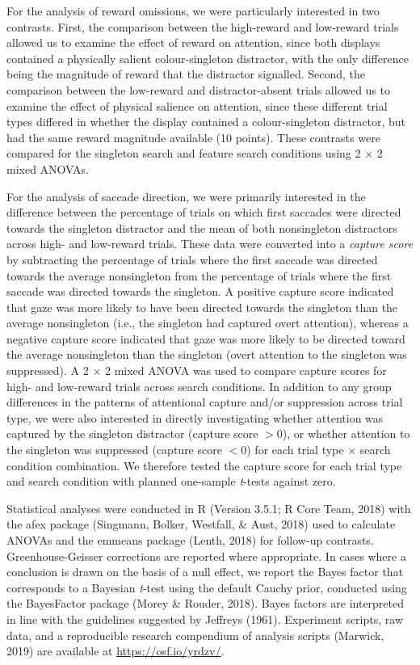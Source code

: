 \documentclass[man, a4paper, noextraspace, 11pt,floatsintext]{apa6}
\theoremstyle{definition}
\theoremstyle{definition}
\theoremstyle{definition}
\theoremstyle{remark}
\begin{document}
For the analysis of reward omissions, we were particularly interested in
two contrasts. First, the comparison between the high-reward and
low-reward trials allowed us to examine the effect of reward on
attention, since both displays contained a physically salient
colour-singleton distractor, with the only difference being the
magnitude of reward that the distractor signalled. Second, the
comparison between the low-reward and distractor-absent trials allowed
us to examine the effect of physical salience on attention, since these
different trial types differed in whether the display contained a
colour-singleton distractor, but had the same reward magnitude available
(10 points). These contrasts were compared for the singleton search and
feature search conditions using 2 \(\times\) 2 mixed ANOVAs.

For the analysis of saccade direction, we were primarily interested in
the difference between the percentage of trials on which first saccades
were directed towards the singleton distractor and the mean of both
nonsingleton distractors across high- and low-reward trials. These data
were converted into a \emph{capture score} by subtracting the percentage
of trials where the first saccade was directed towards the average
nonsingleton from the percentage of trials where the first saccade was
directed towards the singleton. A positive capture score indicated that
gaze was more likely to have been directed towards the singleton than
the average nonsingleton (i.e., the singleton had captured overt
attention), whereas a negative capture score indicated that gaze was
more likely to be directed toward the average nonsingleton than the
singleton (overt attention to the singleton was suppressed). A 2
\(\times\) 2 mixed ANOVA was used to compare capture scores for high-
and low-reward trials across search conditions. In addition to any group
differences in the patterns of attentional capture and/or suppression
across trial type, we were also interested in directly investigating
whether attention was captured by the singleton distractor (capture
score \(>0\)), or whether attention to the singleton was suppressed
(capture score \(<0\)) for each trial type \(\times\) search condition
combination. We therefore tested the capture score for each trial type
and search condition with planned one-sample \emph{t}-tests against
zero.

Statistical analyses were conducted in R (Version 3.5.1; R Core Team,
2018) with the afex package (Singmann, Bolker, Westfall, \& Aust, 2018)
used to calculate ANOVAs and the emmeans package (Lenth, 2018) for
follow-up contrasts. Greenhouse-Geisser corrections are reported where
appropriate. In cases where a conclusion is drawn on the basis of a null
effect, we report the Bayes factor that corresponds to a Bayesian
\emph{t}-test using the default Cauchy prior, conducted using the
BayesFactor package (Morey \& Rouder, 2018). Bayes factors are
interpreted in line with the guidelines suggested by Jeffreys (1961).
Experiment scripts, raw data, and a reproducible research compendium of
analysis scripts (Marwick, 2019) are available at
\url{https://osf.io/yrdzv/}.
\end{document}
